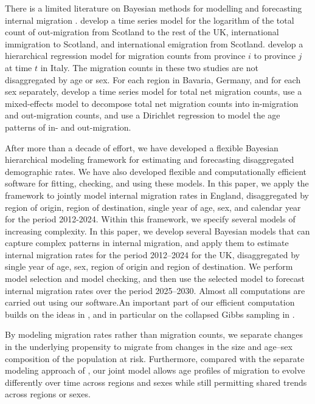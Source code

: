 \documentclass{article}
\begin{document}
{\color{yellow}There is a limited literature on Bayesian methods for modelling and forecasting internal migration \citep{wisniowski2014baysian,zhang2020bayesian,furfaro2021bayesian,goes2026probabilistic}.} {\color{magenta} \citet{wisniowski2014baysian} develop a time series model for the logarithm of the total count of out-migration from Scotland to the rest of the UK, international immigration to Scotland, and international emigration from Scotland. \citet{furfaro2021bayesian} develop a hierarchical regression model for migration counts from province 
$i$ to province $j$ at time $t$ in Italy. The migration counts in these two studies are not disaggregated by age or sex. For each region in Bavaria, Germany, and for each sex separately, \citet{goes2026probabilistic} develop a time series model for total net migration counts, use a mixed-effects model to decompose total net migration counts into in-migration and out-migration counts, and use a Dirichlet regression to model the age patterns of in- and out-migration.}

{\color{magenta}After more than a decade of effort, we have developed a flexible Bayesian hierarchical modeling framework for estimating and forecasting disaggregated demographic rates. We have also developed flexible and computationally efficient software for fitting, checking, and using these models. In this paper, we apply the framework to jointly model internal migration rates in England, disaggregated by region of origin, region of destination, single year of age, sex, and calendar year for the period 2012-2024. Within this framework, we specify several models of increasing complexity. }
{\color{yellow}In this paper, we develop several Bayesian models that can capture complex patterns in internal migration, and apply them to estimate internal migration rates for the period 2012–2024 for the UK, disaggregated by single year of age, sex, region of origin and region of destination.} We perform model selection and model checking, and then use the selected model to forecast internal migration rates over the period 2025–2030. {\color{magenta}Almost all computations are carried out using our software.}{\color{yellow}An important part of our efficient computation builds on the ideas in \cite{liu2001monte}, and in particular on the collapsed Gibbs sampling in \cite{liu1994collapsed}.}

{\color{magenta}By modeling migration rates rather than migration counts, we separate changes in the underlying propensity to migrate from changes in the size and age–sex composition of the population at risk. Furthermore, compared with the separate modeling approach of \citet{goes2026probabilistic}, our joint model allows age profiles of migration to evolve differently over time across regions and sexes while still permitting shared trends across regions or sexes.} 
\end{document}
